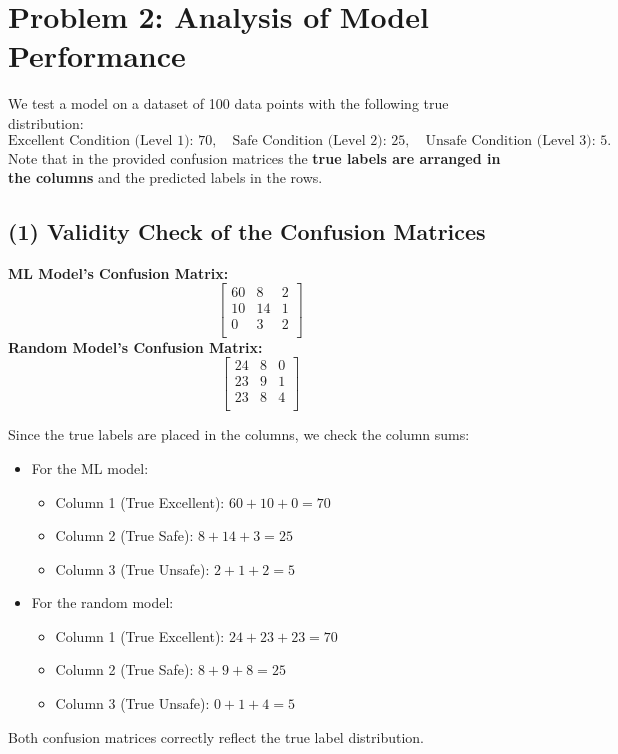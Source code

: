 \documentclass[12pt]{article}
\begin{document}
\newpage

\section*{Problem 2: Analysis of Model Performance}

We test a model on a dataset of 100 data points with the following true distribution:
\[
\text{Excellent Condition (Level 1): }70,\quad \text{Safe Condition (Level 2): }25,\quad \text{Unsafe Condition (Level 3): }5.
\]
Note that in the provided confusion matrices the \textbf{true labels are arranged in the columns} and the predicted labels in the rows.

\subsection*{(1) Validity Check of the Confusion Matrices}

\textbf{ML Model's Confusion Matrix:}
\[
\begin{bmatrix}
60 & 8 & 2 \\
10 & 14 & 1 \\
0 & 3 & 2 \\
\end{bmatrix}
\]
\textbf{Random Model's Confusion Matrix:}
\[
\begin{bmatrix}
24 & 8 & 0 \\
23 & 9 & 1 \\
23 & 8 & 4 \\
\end{bmatrix}
\]

Since the true labels are placed in the columns, we check the column sums:
\begin{itemize}
    \item For the ML model:
    \begin{itemize}
        \item Column 1 (True Excellent): \(60+10+0 = 70\)
        \item Column 2 (True Safe): \(8+14+3 = 25\)
        \item Column 3 (True Unsafe): \(2+1+2 = 5\)
    \end{itemize}
    \item For the random model:
    \begin{itemize}
        \item Column 1 (True Excellent): \(24+23+23 = 70\)
        \item Column 2 (True Safe): \(8+9+8 = 25\)
        \item Column 3 (True Unsafe): \(0+1+4 = 5\)
    \end{itemize}
\end{itemize}
Both confusion matrices correctly reflect the true label distribution.
\end{document}
